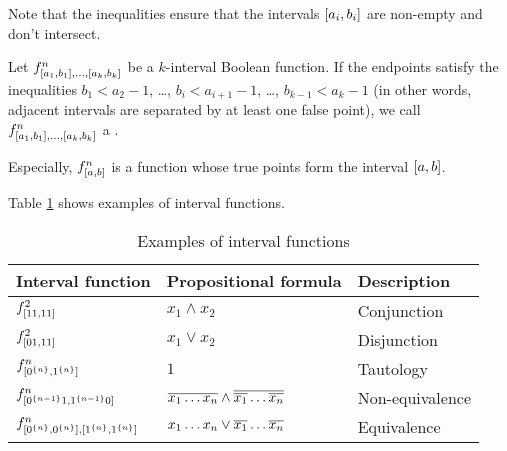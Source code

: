 Note that the inequalities ensure
that the intervals $[a_i, b_i]$
are non-empty and don't intersect.

\begin{definition}
\label{def:properkibf}
Let
$f^n_{[a_1, b_1], \ldots, [a_k, b_k]}$
be a $k$-interval Boolean function.
If the endpoints satisfy the inequalities
$b_1 < a_2 - 1$, \ldots, $b_i < a_{i+1} - 1$, \ldots,
$b_{k-1} < a_k - 1$
(in other words, adjacent intervals
are separated by at least one false point),
we call
$f^n_{[a_1, b_1], \ldots, [a_k, b_k]}$
a .
\end{definition}


Especially,
$f^{n}_{[a, b]}$ is a function
whose true points form the interval $[a, b]$.

Table \ref{table:exampleintfns} shows
examples of interval functions.

\begin{table}[H]
\label{table:exampleintfns}
\centering
\begin{tabular}{lll}
Interval function & Propositional formula & Description \\
\hline
$f^{2}_{[11, 11]}$ &
$x_1 \wedge x_2$ & Conjunction \\
$f^{2}_{[01, 11]}$ &
$x_1 \vee x_2$ & Disjunction \\
$f^{n}_{[0^{\{n\}}, 1^{\{n\}}]}$ &
$1$ & Tautology \\
$f^{n}_{[0^{\{n-1\}} 1, 1^{\{n-1\}} 0]}$ &
$\overline{x_1 \ldots x_n} \wedge
\overline{\overline{x_1} \ldots \overline{x_n}}$ &
Non-equivalence \\
$f^n_{[0^{\{n\}}, 0^{\{n\}}],
[1^{\{n\}}, 1^{\{n\}}]}$ &
$x_1 \ldots x_n \vee \overline{x_1} \ldots \overline{x_n}$ &
Equivalence
\end{tabular}
\caption{Examples of interval functions}
\end{table}
